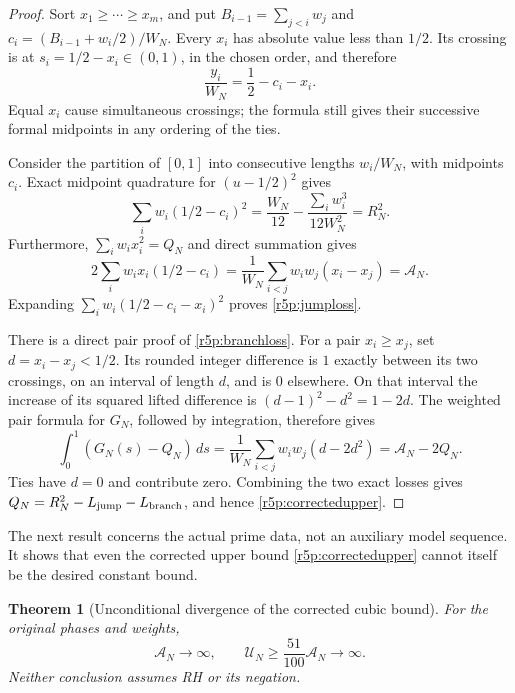 \documentclass[11pt,a4paper]{article}
\newtheorem{theorem}{Theorem}[section]
\theoremstyle{definition}\newtheorem{definition}[theorem]{Definition}
\theoremstyle{remark}\newtheorem{remark}[theorem]{Remark}
\numberwithin{equation}{section}
\begin{document}
\begin{proof}
Sort $x_1\geq\cdots\geq x_m$, and put
$B_{i-1}=\sum_{j<i}w_j$ and
$c_i=(B_{i-1}+w_i/2)/W_N$.
Every $x_i$ has absolute value less than $1/2$.
Its crossing is at $s_i=1/2-x_i\in(0,1)$, in the chosen order,
and therefore
\[
 \frac{y_i}{W_N}=\frac12-c_i-x_i.
\]
Equal $x_i$ cause simultaneous crossings; the formula still gives
their successive formal midpoints in any ordering of the ties.

Consider the partition of $[0,1]$ into consecutive lengths
$w_i/W_N$, with midpoints $c_i$.  Exact midpoint quadrature for
$(u-1/2)^2$ gives
\[
 \sum_iw_i(1/2-c_i)^2
       =\frac{W_N}{12}-\frac{\sum_iw_i^3}{12W_N^2}=R_N^2.
\]
Furthermore, $\sum_iw_ix_i^2=Q_N$ and direct summation gives
\[
 2\sum_iw_ix_i(1/2-c_i)
  =\frac1{W_N}\sum_{i<j}w_iw_j(x_i-x_j)=\mathcal A_N.
\]
Expanding $\sum_iw_i(1/2-c_i-x_i)^2$ proves
\eqref{r5p:jumploss}.

There is a direct pair proof of \eqref{r5p:branchloss}.
For a pair $x_i\geq x_j$, set $d=x_i-x_j<1/2$.
Its rounded integer difference is $1$ exactly between its two
crossings, on an interval of length $d$, and is $0$ elsewhere.
On that interval the increase of its squared lifted difference
is $(d-1)^2-d^2=1-2d$.
The weighted pair formula for $G_N$, followed by integration,
therefore gives
\[
 \int_0^1(G_N(s)-Q_N)\,ds
   =\frac1{W_N}\sum_{i<j}w_iw_j(d-2d^2)
   =\mathcal A_N-2Q_N.
\]
Ties have $d=0$ and contribute zero.  Combining the two exact
losses gives $Q_N=R_N^2-L_{\rm jump}-L_{\rm branch}$,
and hence \eqref{r5p:correctedupper}.
\end{proof}

The next result concerns the actual prime data, not an auxiliary
model sequence.  It shows that even the corrected upper bound
\eqref{r5p:correctedupper} cannot itself be the desired constant
bound.

\begin{theorem}[Unconditional divergence of the corrected cubic bound]
\label{r5p:divergence}
For the original phases and weights,
\begin{equation}\label{r5p:divergenceformula}
 \mathcal A_N\longrightarrow\infty,
 \qquad
 \mathcal U_N\geq\frac{51}{100}\mathcal A_N
             \longrightarrow\infty.
\end{equation}
Neither conclusion assumes RH or its negation.
\end{theorem}
\end{document}
